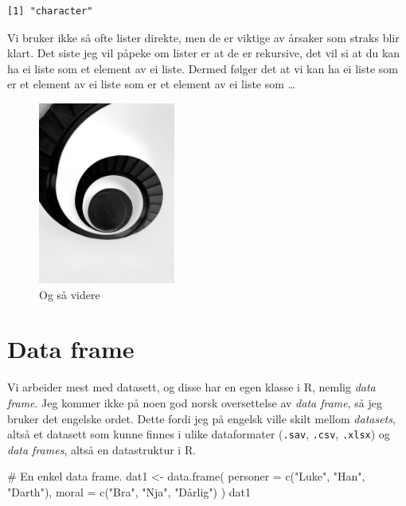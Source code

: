 \documentclass[
  letterpaper,
  DIV=11,
  numbers=noendperiod]{scrartcl}
\newenvironment{Shaded}{\begin{snugshade}}{\end{snugshade}}
\newcommand{\AttributeTok}[1]{\textcolor[rgb]{0.40,0.45,0.13}{#1}}
\newcommand{\CommentTok}[1]{\textcolor[rgb]{0.37,0.37,0.37}{#1}}
\newcommand{\FunctionTok}[1]{\textcolor[rgb]{0.28,0.35,0.67}{#1}}
\newcommand{\NormalTok}[1]{\textcolor[rgb]{0.00,0.23,0.31}{#1}}
\newcommand{\OtherTok}[1]{\textcolor[rgb]{0.00,0.23,0.31}{#1}}
\newcommand{\StringTok}[1]{\textcolor[rgb]{0.13,0.47,0.30}{#1}}
\begin{document}
\begin{verbatim}
[1] "character"
\end{verbatim}

Vi bruker ikke så ofte lister direkte, men de er viktige av årsaker som
straks blir klart. Det siste jeg vil påpeke om lister er at de er
rekursive, det vil si at du kan ha ei liste som et element av ei liste.
Dermed følger det at vi kan ha ei liste som er et element av ei liste
som er et element av ei liste som \ldots{}

\begin{figure}

{\centering \includegraphics[width=0.4\textwidth,height=\textheight]{img/spiral-robin-schreiner-d8OiIdAdKNA-unsplash.jpg}

}

\caption{Og så videre}

\end{figure}

\hypertarget{data-frame}{%
\section{Data frame}\label{data-frame}}

Vi arbeider mest med datasett, og disse har en egen klasse i R, nemlig
\emph{data frame}. Jeg kommer ikke på noen god norsk oversettelse av
\emph{data frame}, så jeg bruker det engelske ordet. Dette fordi jeg på
engelsk ville skilt mellom \emph{datasets}, altså et datasett som kunne
finnes i ulike dataformater (\texttt{.sav}, \texttt{.csv},
\texttt{.xlsx}) og \emph{data frames}, altså en datastruktur i R.

\begin{Shaded}
\begin{Highlighting}[]
\CommentTok{\# En enkel data frame.}
\NormalTok{dat1 }\OtherTok{\textless{}{-}} \FunctionTok{data.frame}\NormalTok{(}
  \AttributeTok{personer =} \FunctionTok{c}\NormalTok{(}\StringTok{"Luke"}\NormalTok{, }\StringTok{"Han"}\NormalTok{, }\StringTok{"Darth"}\NormalTok{),}
  \AttributeTok{moral =} \FunctionTok{c}\NormalTok{(}\StringTok{"Bra"}\NormalTok{, }\StringTok{"Nja"}\NormalTok{, }\StringTok{"Dårlig"}\NormalTok{)}
\NormalTok{)}
\NormalTok{dat1}
\end{Highlighting}
\end{Shaded}
\end{document}
